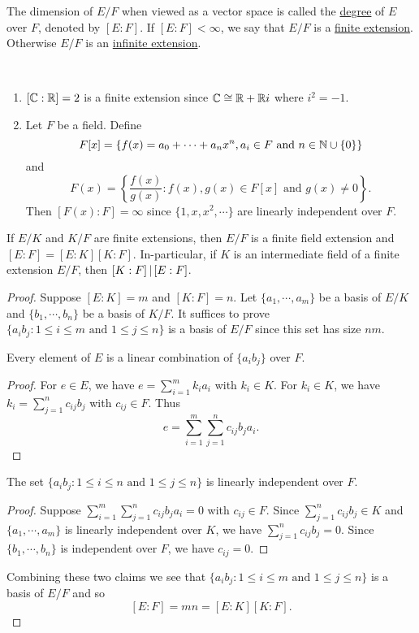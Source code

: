 \documentclass[11pt]{article}
\begin{document}
\begin{definition}
    The dimension of $E/F$ when viewed as a vector space is called the \ul{degree} of $E$ over $F$, denoted by $[E:F]$. If $[E:F]<\infty$, we say that $E/F$ is a \ul{finite extension}. Otherwise $E/F$ is an \ul{infinite extension}.
\end{definition}

\begin{example}\,
    \begin{enumerate}
        \item $[\mathbb{C}:\mathbb{R}]=2$ is a finite extension since $\mathbb{C}\cong\mathbb{R}+\mathbb{R} i$ where $i^2=-1$.

        \item Let $F$ be a field. Define
        \[F[x]=\{f(x)=a_0+\cdots+a_nx^n,a_i\in F\text{ and }n\in\mathbb{N}\cup\{0\}\}\]
        and
        \[F(x)=\left\{\frac{f(x)}{g(x)}:f(x),g(x)\in F[x]\text{ and }g(x)\neq0\right\}.\]
        Then $[F(x):F]=\infty$ since $\{1,x,x^2,\cdots\}$ are linearly independent over $F$.
    \end{enumerate}
\end{example}

\begin{theorem}
    If $E/K$ and $K/F$ are finite extensions, then $E/F$ is a finite field extension and $[E:F]=[E:K][K:F]$. In-particular, if $K$ is an intermediate field of a finite extension $E/F$, then $[K:F]\,|\, [E:F]$.
\end{theorem}

\begin{proof}
    Suppose $[E:K]=m$ and $[K:F]=n$. Let $\{a_1,\cdots,a_m\}$ be a basis of $E/K$ and $\{b_1,\cdots,b_n\}$ be a basis of $K/F$. It suffices to prove $\{a_ib_j:1\leq i\leq m\text{ and }1\leq j\leq n\}$ is a basis of $E/F$ since this set has size $nm$.
    \begin{claim}
        Every element of $E$ is a linear combination of $\{a_ib_j\}$ over $F$.
    \end{claim}
    \begin{proof}
        For $e\in E$, we have $e=\sum\limits_{i=1}^m k_ia_i$ with $k_i\in K$. For $k_i\in K$, we have $k_i=\sum\limits_{j=1}^nc_{ij}b_j$ with $c_{ij}\in F$. Thus
        \[e=\sum\limits_{i=1}^m\sum\limits_{j=1}^n c_{ij}b_ja_i.\]
    \end{proof}
    \begin{claim}
        The set $\{a_ib_j:1\leq i\leq n\text{ and }1\leq j\leq n\}$ is linearly independent over $F$.
    \end{claim}
    \begin{proof}
        Suppose $\sum\limits_{i=1}^m\sum\limits_{j=1}^nc_{ij}b_ja_i=0$ with $c_{ij}\in F$. Since $\sum\limits_{j=1}^nc_{ij}b_j\in K$ and $\{a_1,\cdots,a_m\}$ is linearly independent over $K$, we have $\sum\limits_{j=1}^nc_{ij}b_j=0$. Since $\{b_1,\cdots,b_n\}$ is independent over $F$, we have $c_{ij}=0$.
        
    \end{proof}
    Combining these two claims we see that $\{a_ib_j:1\leq i\leq m\text{ and }1\leq j\leq n\}$ is a basis of $E/F$ and so
    \[[E:F]=mn=[E:K][K:F].\]
\end{proof}
\end{document}
